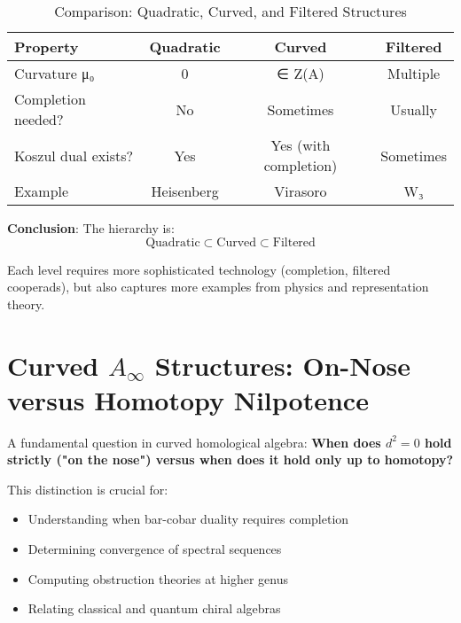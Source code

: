 \begin{table}[h]
\centering
\caption{Comparison: Quadratic, Curved, and Filtered Structures}
\begin{tabular}{|l|c|c|c|}
\hline
\textbf{Property} & \textbf{Quadratic} & \textbf{Curved} & \textbf{Filtered}\\
\hline
Curvature μ₀ & 0 & ∈ Z(A) & Multiple\\
Completion needed? & No & Sometimes & Usually\\
Koszul dual exists? & Yes & Yes (with completion) & Sometimes\\
Example & Heisenberg & Virasoro & W₃\\
\hline
\end{tabular}
\end{table}

\textbf{Conclusion}: The hierarchy is:
\begin{equation}
\text{Quadratic} \subset \text{Curved} \subset \text{Filtered}
\end{equation}

Each level requires more sophisticated technology (completion, filtered cooperads), but 
also captures more examples from physics and representation theory.


\section{Curved $A_\infty$ Structures: On-Nose versus Homotopy Nilpotence}
\label{sec:on-nose-vs-homotopy}

A fundamental question in curved homological algebra: \textbf{When does $d^2 = 0$ hold strictly 
("on the nose") versus when does it hold only up to homotopy?}

This distinction is crucial for:
\begin{itemize}
\item Understanding when bar-cobar duality requires completion
\item Determining convergence of spectral sequences
\item Computing obstruction theories at higher genus
\item Relating classical and quantum chiral algebras
\end{itemize}

\begin{center}
\end{center}

